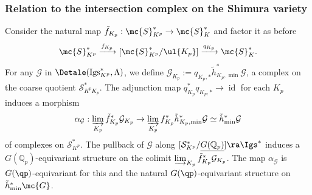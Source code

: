 \documentclass[letterpaper,11pt]{amsart}
\begin{document}
\subsubsection{Relation to the intersection complex on the Shimura variety}
Consider the natural map $\tilde{f}_{K_p}:\mc{S}^\ast_{K^p}\to \mc{S}_K^\ast$ and factor it as before
\begin{equation}\label{Eq: MapfromInfiniteLevel}
\mc{S}^\ast_{K^p}\xrightarrow{f_{K_p}} [\mc{S}^\ast_{K^p}/\ul{K_p}]\xrightarrow{q_{K_p}}\mc{S}_K^\ast.
\end{equation}
For any $\mathcal{G}$ in $\Detale(\mathrm{Igs}^*_{K^p},\Lambda)$, we define $\mathcal{G}_{K_p}:=q_{K_p,*}\tilde{h}_{K_p,\min}^*\mathcal{G}$, a complex on the coarse quotient $\mathcal{S}^*_{K^pK_p}$. The adjunction map $q_{K_p}^\ast q_{K_p,\ast}\to \operatorname{id}$ for each $K_p$ induces a morphism
\[
\alpha_{\mathcal{G}}:\varinjlim_{K_p} \tilde{f}^*_{K_p}\mathcal{G}_{K_p} \to
\varinjlim_{K_p} f^*_{K_p}\tilde{h}^*_{K_p,\min}\mathcal{G}
\simeq \tilde{h}_{\min}^*\mathcal{G}
\]
of complexes on $\mathcal{S}^*_{K^p}$. The pullback of $\mathcal{G}$ along $[\mathcal{S}_{K^p}^*/\underline{G(\mathbb{Q}_p)}] \ra \Igs^{*}$ induces a $G(\mathbb{Q}_p)$-equivariant structure on the colimit $\varinjlim_{K_p} \tilde{f}^*_{K_p}\mathcal{G}_{K_p}$. The map $\alpha_{\mathcal{G}}$ is $G(\qp)$-equivariant for this and the natural $G(\qp)$-equivariant structure on $\tilde{h}^\ast_{\min} \mc{G}$.  
\end{document}
